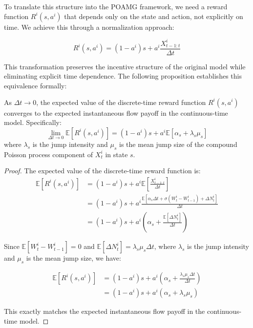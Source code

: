 To translate this structure into the POAMG framework, we need a reward function $R^i(s, a^i)$ that depends only on the state and action, not explicitly on time. We achieve this through a normalization approach:

\begin{equation}
    R^i(s, a^i) = (1-a^i)s + a^i \frac{X^i_{t-1:t}}{\Delta t}
\end{equation}

This transformation preserves the incentive structure of the original model while eliminating explicit time dependence. The following proposition establishes this equivalence formally:

\begin{proposition}
As $\Delta t \to 0$, the expected value of the discrete-time reward function $R^i(s, a^i)$ converges to the expected instantaneous flow payoff in the continuous-time model. Specifically:
\begin{equation}
    \lim_{\Delta t \to 0} \mathbb{E}[R^i(s, a^i)] = (1-a^i)s + a^i\mathbb{E}[\alpha_s + \lambda_s\mu_s]
\end{equation}
where $\lambda_s$ is the jump intensity and $\mu_s$ is the mean jump size of the compound Poisson process component of $X^i_t$ in state $s$.
\end{proposition}

\begin{proof}
The expected value of the discrete-time reward function is:
\begin{align}
    \mathbb{E}[R^i(s, a^i)] &= (1-a^i)s + a^i\mathbb{E}\left[\frac{X^i_{t-1:t}}{\Delta t}\right] \\
    &= (1-a^i)s + a^i\frac{\mathbb{E}[\alpha_s \Delta t + \sigma(W^i_t - W^i_{t-1}) + \Delta N^i_t]}{\Delta t} \\
    &= (1-a^i)s + a^i\left(\alpha_s + \frac{\mathbb{E}[\Delta N^i_t]}{\Delta t}\right)
\end{align}

Since $\mathbb{E}[W^i_t - W^i_{t-1}] = 0$ and $\mathbb{E}[\Delta N^i_t] = \lambda_s\mu_s\Delta t$, where $\lambda_s$ is the jump intensity and $\mu_s$ is the mean jump size, we have:

\begin{align}
    \mathbb{E}[R^i(s, a^i)] &= (1-a^i)s + a^i\left(\alpha_s + \frac{\lambda_s\mu_s\Delta t}{\Delta t}\right) \\
    &= (1-a^i)s + a^i(\alpha_s + \lambda_s\mu_s)
\end{align}

This exactly matches the expected instantaneous flow payoff in the continuous-time model.
\end{proof}

